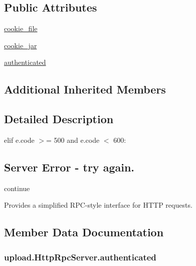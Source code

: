 \subsection*{Public Attributes}
\begin{DoxyCompactItemize}
\item 
\hyperlink{classupload_1_1HttpRpcServer_ad5c1a730c030f9d3b5f70c2e0d8b9a1d}{cookie\+\_\+file}
\item 
\hyperlink{classupload_1_1HttpRpcServer_a1b9c9af7f0a46afd84a9d524782323bf}{cookie\+\_\+jar}
\item 
\hyperlink{classupload_1_1HttpRpcServer_aaa356e2491537dd0d4bfc5b1bb0fec96}{authenticated}
\end{DoxyCompactItemize}
\subsection*{Additional Inherited Members}


\subsection{Detailed Description}
elif e.\+code $>$= 500 and e.\+code $<$ 600\+: \subsection*{Server Error -\/ try again.}

continue \begin{DoxyVerb}Provides a simplified RPC-style interface for HTTP requests.\end{DoxyVerb}
 

\subsection{Member Data Documentation}
\subsubsection[{\texorpdfstring{authenticated}{authenticated}}]{\setlength{\rightskip}{0pt plus 5cm}upload.\+Http\+Rpc\+Server.\+authenticated}\hypertarget{classupload_1_1HttpRpcServer_aaa356e2491537dd0d4bfc5b1bb0fec96}{}\label{classupload_1_1HttpRpcServer_aaa356e2491537dd0d4bfc5b1bb0fec96}
